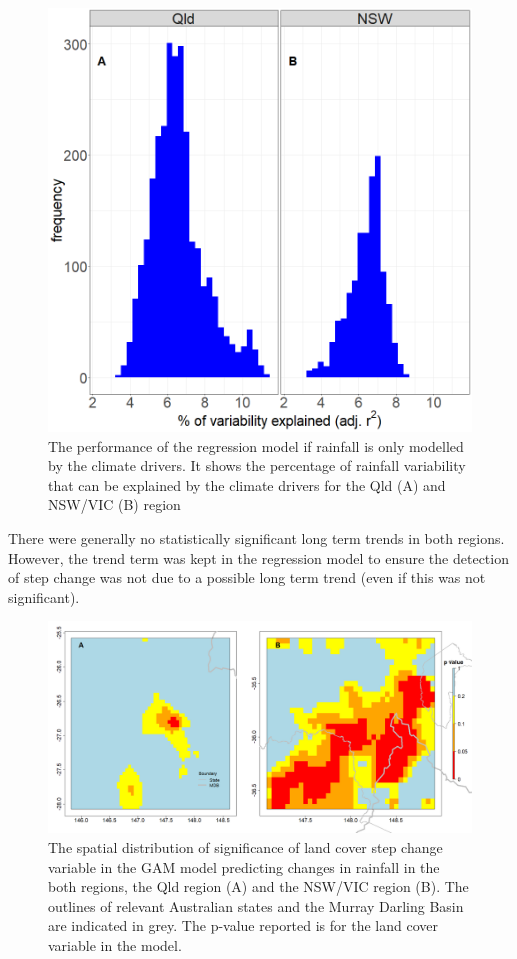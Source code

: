 \documentclass[fleqn,10pt,lineno]{wlpeerj} %
\theoremstyle{definition}
\theoremstyle{definition}
\theoremstyle{definition}
\theoremstyle{remark}
\begin{document}
\begin{figure}
\includegraphics[width=0.7\linewidth]{figures/Fig7} \caption{The performance of the regression model if rainfall is only modelled by the climate drivers. It shows the percentage of rainfall variability that can be explained by the climate drivers for the Qld (A) and NSW/VIC (B) region}\label{fig:rsq}
\end{figure}

There were generally no statistically significant long term trends in
both regions. However, the trend term was kept in the regression model
to ensure the detection of step change was not due to a possible long
term trend (even if this was not significant).

\begin{figure}
\includegraphics[width=0.9\linewidth]{figures/Fig8} \caption{The spatial distribution of significance of land cover step change variable in the GAM model predicting changes in rainfall in the both regions, the Qld region (A) and the NSW/VIC region (B). The outlines of relevant Australian states and the Murray Darling Basin are indicated in grey. The p-value reported is for the land cover variable in the model.}\label{fig:LCp}
\end{figure}
\end{document}
